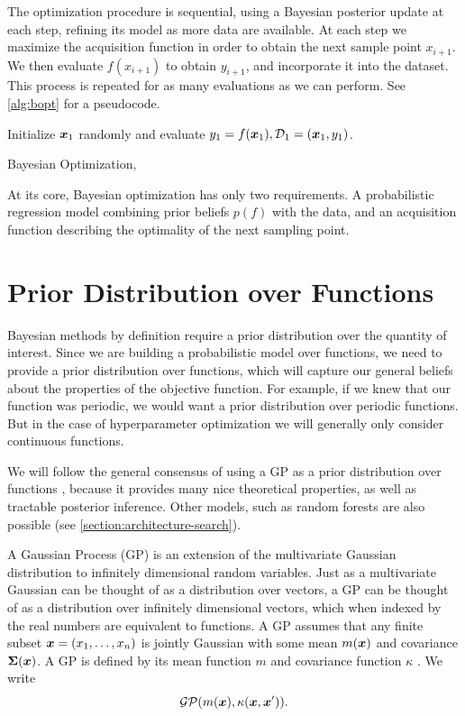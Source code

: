 The optimization procedure is sequential, using a Bayesian posterior update at
each step, refining its model as more data are available. At each step we
maximize the acquisition function in order to obtain the next sample point
$x_{i+1}$. We then evaluate $f(x_{i+1})$ to obtain $y_{i+1}$, and incorporate
it into the dataset. This process is repeated for as many evaluations as we
can perform. See \autoref{alg:bopt} for a pseudocode.

\begin{algorithm}
  \DontPrintSemicolon
  \SetAlgoLined
  Initialize ${\boldsymbol{x}}_1$ randomly and evaluate $y_1 = f({\boldsymbol{x}}_1), \mathcal{D}_1 = {({\boldsymbol{x}}_1, y_1)}$. \;
  \caption{Bayesian Optimization, \cite{nando-bopt-tutorial}}
  \label{alg:bopt}
\end{algorithm}


At its core, Bayesian optimization has only two requirements. A probabilistic
regression model combining prior beliefs $p(f)$ with the data, and an
acquisition function describing the optimality of the next sampling point.

\section{Prior Distribution over Functions}

Bayesian methods by definition require a prior distribution over the quantity
of interest. Since we are building a probabilistic model over functions, we
need to provide a prior distribution over functions, which will capture our
general beliefs about the properties of the objective function. For example, if
we knew that our function was periodic, we would want a prior distribution over
periodic functions. But in the case of hyperparameter optimization we will
generally only consider continuous functions.

We will follow the general consensus of using a GP as a prior distribution over
functions \citep{nando-bopt-tutorial}, because it provides many nice
theoretical properties, as well as tractable posterior inference. Other models,
such as random forests are also possible (see
\autoref{section:architecture-search}).

A Gaussian Process (GP) is an extension of
the multivariate Gaussian distribution to infinitely dimensional random
variables. Just as a multivariate Gaussian can be thought of as a distribution
over vectors, a GP can be thought of as a distribution over infinitely
dimensional vectors, which when indexed by the real numbers are equivalent to
functions. A GP assumes that any finite subset ${\boldsymbol{x}} = (x_1, \ldots, x_n)$ is
jointly Gaussian with some mean $m({\boldsymbol{x}})$ and covariance ${\bm{\Sigma}}({\boldsymbol{x}})$. A GP is
defined by its mean function $m$ and covariance function $\kappa$
\citep{murphy2012machine}. We write
$$
  \mathcal{G}\mathcal{P}(m({\boldsymbol{x}}), \kappa({\boldsymbol{x}}, {\boldsymbol{x}}')).
$$

